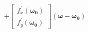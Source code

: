 \documentclass[preview]{standalone}
\begin{document}
\begin{align*}
+ \begin{bmatrix} f_x^{\prime}(\mathbf{\omega_0}) \\ f_y^{\prime}(\mathbf{\omega_0}) \end{bmatrix} (\mathbf{\omega} - \mathbf{\omega_0})
\end{align*}
\end{document}
